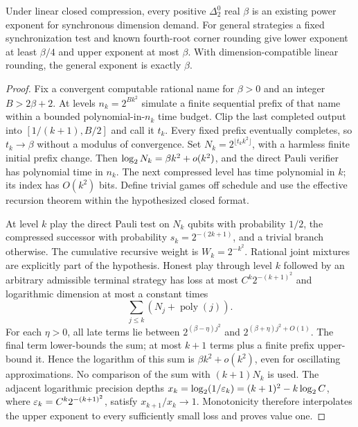 \begin{theorem}\label{thm:conditional}
Under linear closed compression, every positive $\Delta^0_2$ real $\beta$ is an existing power exponent for synchronous dimension demand. For general strategies a fixed synchronization test and known fourth-root corner rounding give lower exponent at least $\beta/4$ and upper exponent at most $\beta$. With dimension-compatible linear rounding, the general exponent is exactly $\beta$.
\end{theorem}
\begin{proof}
Fix a convergent computable rational name for $\beta>0$ and an integer $B>2\beta+2$. At levels $n_k=2^{Bk^2}$ simulate a finite sequential prefix of that name within a bounded polynomial-in-$n_k$ time budget. Clip the last completed output into $[1/(k+1),B/2]$ and call it $t_k$. Every fixed prefix eventually completes, so $t_k\to\beta$ without a modulus of convergence. Set $N_k=2^{\lfloor t_kk^2\rfloor}$, with a harmless finite initial prefix change. Then $\log_2 N_k=\beta k^2+o(k^2)$, and the direct Pauli verifier has polynomial time in $n_k$. The next compressed level has time polynomial in $k$; its index has $O(k^2)$ bits. Define trivial games off schedule and use the effective recursion theorem within the hypothesized closed format.

At level $k$ play the direct Pauli test on $N_k$ qubits with probability $1/2$, the compressed successor with probability $s_k=2^{-(2k+1)}$, and a trivial branch otherwise. The cumulative recursive weight is $W_k=2^{-k^2}$. Rational joint mixtures are explicitly part of the hypothesis. Honest play through level $k$ followed by an arbitrary admissible terminal strategy has loss at most $C^k2^{-(k+1)^2}$ and logarithmic dimension at most a constant times
\[
 \sum_{j\le k}(N_j+\operatorname{poly}(j)).
\]
For each $\eta>0$, all late terms lie between $2^{(\beta-\eta)j^2}$ and $2^{(\beta+\eta)j^2+O(1)}$. The final term lower-bounds the sum; at most $k+1$ terms plus a finite prefix upper-bound it. Hence the logarithm of this sum is $\beta k^2+o(k^2)$, even for oscillating approximations. No comparison of the sum with $(k+1)N_k$ is used. The adjacent logarithmic precision depths $x_k=\log_2(1/\varepsilon_k)=(k+1)^2-k\log_2 C$, where $\varepsilon_k=C^k2^{-(k+1)^2}$, satisfy $x_{k+1}/x_k\to1$. Monotonicity therefore interpolates the upper exponent to every sufficiently small loss and proves value one.


\end{proof}
